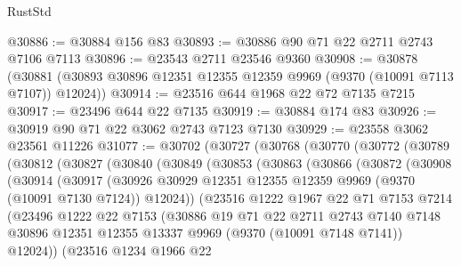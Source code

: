 \begin{lexlean}{RustStd}
\begin{coremodule}
@30886 := @30884 @156 @83
@30893 := @30886 @90 @71 @22 @2711 @2743 @7106 @7113
@30896 := @23543 @2711 @23546 @9360
@30908 := @30878
    (@30881 (@30893 @30896 @12351 @12355 @12359 @9969 (@9370 (@10091 @7113 @7107)) @12024))
@30914 := @23516 @644 @1968 @22 @72 @7135 @7215
@30917 := @23496 @644 @22 @7135
@30919 := @30884 @174 @83
@30926 := @30919 @90 @71 @22 @3062 @2743 @7123 @7130
@30929 := @23558 @3062 @23561 @11226
@31077 := @30702
    (@30727
      (@30768
        (@30770
          (@30772
            (@30789
              (@30812
                (@30827
                  (@30840
                    (@30849
                      (@30853
                        (@30863
                          (@30866
                            (@30872
                              (@30908
                                (@30914
                                  (@30917
                                    (@30926
                                      @30929
                                      @12351
                                      @12355
                                      @12359
                                      @9969
                                      (@9370 (@10091 @7130 @7124))
                                      @12024))
                                  (@23516
                                    @1222
                                    @1967
                                    @22
                                    @71
                                    @7153
                                    @7214
                                    (@23496
                                      @1222
                                      @22
                                      @7153
                                      (@30886
                                        @19
                                        @71
                                        @22
                                        @2711
                                        @2743
                                        @7140
                                        @7148
                                        @30896
                                        @12351
                                        @12355
                                        @13337
                                        @9969
                                        (@9370 (@10091 @7148 @7141))
                                        @12024))
                                    (@23516
                                      @1234
                                      @1966
                                      @22

\end{coremodule}
\end{lexlean}
